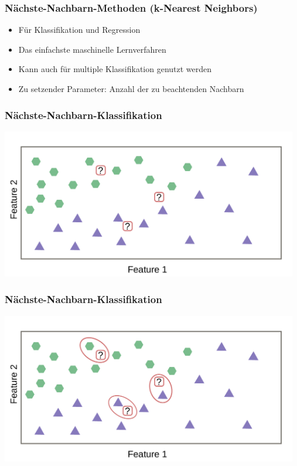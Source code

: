 \documentclass[aspectratio=169]{beamer}
\begin{document}
\setcounter{tocdepth}{2}
\begin{frame}{}
   \tableofcontents[currentsubsection,hideothersubsections,
     subsectionstyle=show/shaded]
\end{frame}

\begin{frame}
  \frametitle{Nächste-Nachbarn-Methoden (k-Nearest Neighbors)}
  \begin{block}{}
    \begin{center}
      \begin{itemize}
      \item Für Klassifikation und Regression
      \item Das einfachste maschinelle Lernverfahren
      \item Kann auch für multiple Klassifikation genutzt werden
      \item Zu setzender Parameter: Anzahl der zu beachtenden Nachbarn
      \end{itemize}
    \end{center}
  \end{block}    
\end{frame}

\begin{frame}
  \frametitle{Nächste-Nachbarn-Klassifikation}
  \begin{center}
    \includegraphics[width=13.0cm]{images/k_nearest_neighbour_classification_only_training_data.pdf}
  \end{center}
\end{frame}

\begin{frame}
  \frametitle{Nächste-Nachbarn-Klassifikation}
  \begin{center}
    \includegraphics[width=13.0cm]{images/k_nearest_neighbour_classification_k_1.pdf}
  \end{center}
\end{frame}
\end{document}
